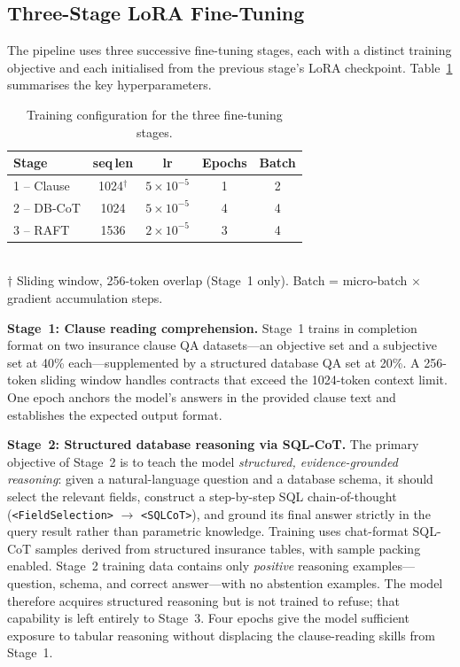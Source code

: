 \subsection{Three-Stage LoRA Fine-Tuning}

The pipeline uses three successive fine-tuning stages, each with a distinct
training objective and each initialised from the previous stage's LoRA
checkpoint.
Table~\ref{tab:stages} summarises the key hyperparameters.

\begin{table}[htbp]
\centering
\caption{Training configuration for the three fine-tuning stages.}
\label{tab:stages}
\small
\begin{tabular}{@{}lcccc@{}}
\toprule
Stage & seq\,len & lr & Epochs & Batch \\
\midrule
1 -- Clause   & 1024$^\dagger$ & $5{\times}10^{-5}$ & 1 & 2 \\
2 -- DB-CoT   & 1024           & $5{\times}10^{-5}$ & 4 & 4 \\
3 -- RAFT     & 1536           & $2{\times}10^{-5}$ & 3 & 4 \\
\bottomrule
\end{tabular}\\[2pt]
{\footnotesize
$\dagger$ Sliding window, 256-token overlap (Stage~1 only).
Batch = micro-batch $\times$ gradient accumulation steps.}
\end{table}

\noindent\textbf{Stage~1: Clause reading comprehension.}
Stage~1 trains in completion format on two insurance clause QA datasets---an
objective set and a subjective set at 40\% each---supplemented by a structured
database QA set at 20\%.
A 256-token sliding window handles contracts that exceed the 1024-token context
limit.
One epoch anchors the model's answers in the provided clause text and
establishes the expected output format.

\noindent\textbf{Stage~2: Structured database reasoning via SQL-CoT.}
The primary objective of Stage~2 is to teach the model \emph{structured,
evidence-grounded reasoning}: given a natural-language question and a
database schema, it should select the relevant fields, construct a step-by-step
SQL chain-of-thought (\texttt{<FieldSelection>} $\to$ \texttt{<SQLCoT>}),
and ground its final answer strictly in the query result rather than
parametric knowledge.
Training uses chat-format SQL-CoT samples derived from structured insurance
tables, with sample packing enabled.
Stage~2 training data contains only \emph{positive} reasoning
examples---question, schema, and correct answer---with no abstention examples.
The model therefore acquires structured reasoning but is not trained to refuse;
that capability is left entirely to Stage~3.
Four epochs give the model sufficient exposure to tabular reasoning without
displacing the clause-reading skills from Stage~1.


